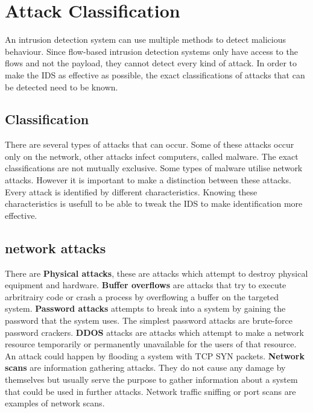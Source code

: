 
\chapter{Attack Classification} %

\label{attack} %

An intrusion detection system can use multiple methods to detect malicious behaviour.  Since flow-based intrusion detection systems only have access to the flows and not the payload, they cannot detect every kind of attack. In order to make the IDS as effective as possible, the exact classifications of attacks that can be detected need to be known.

\section{Classification}
There are several types of attacks that can occur. Some of these attacks occur only on the network, other attacks infect computers, called malware. The exact classifications are not mutually exclusive. Some types of malware utilise network attacks. However it is important to make a distinction between these attacks. Every attack is identified by different characteristics. Knowing these characteristics is usefull to be able to tweak the IDS to make identification more effective.

\section{network attacks}
There are \textbf{Physical attacks}, these are attacks which attempt to destroy physical equipment and hardware. \textbf{Buffer overflows} are attacks that try to execute arbritrairy code or crash a process by overflowing a buffer on the targeted system. \textbf{Password attacks} attempts to break into a system by gaining the password that the system uses. The simplest password attacks are brute-force password crackers. \textbf{DDOS} attacks are attacks which attempt to make a network resource temporarily or permanently unavailable for the users of that resource. An attack could happen by flooding a system with TCP SYN packets. \textbf{Network scans} are information gathering attacks. They do not cause any damage by themselves but usually serve the purpose to gather information about a system that could be used in further attacks. Network traffic sniffing or port scans are examples of network scans. \cite{IPFlow}

